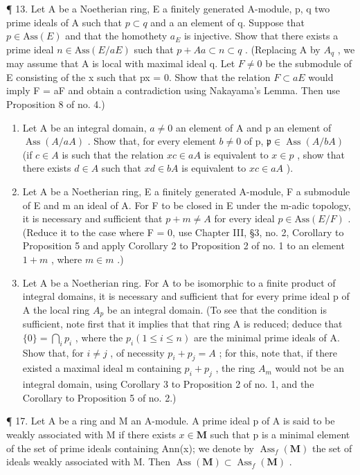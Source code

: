 ¶ 13. Let A be a Noetherian ring, E a finitely generated A-module, p, q two prime ideals of A such that \(p \subset q\) and a an element of q. Suppose that \(p \in \text{Ass}(E)\) and that the homothety \(a_{E}\) is injective. Show that there exists a prime ideal \(n \in \text{Ass}(E/aE)\) such that \(p + Aa \subset n \subset q\) . (Replacing A by \(A_{q}\) , we may assume that A is local with maximal ideal q. Let \(F \neq 0\) be the submodule of E consisting of the x such that px = 0. Show that the relation \(F \subset aE\) would imply F = aF and obtain a contradiction using Nakayama's Lemma. Then use Proposition 8 of no. 4.)

\begin{enumerate}
\def\labelenumi{\arabic{enumi}.}
\setcounter{enumi}{13}
\item
  Let A be an integral domain, \(a \neq 0\) an element of A and p an element of \(\operatorname{Ass}(A/aA)\) . Show that, for every element \(b \neq 0\) of p, \(\mathfrak{p} \in \operatorname{Ass}(A/bA)\) (if \(c \in A\) is such that the relation \(xc \in aA\) is equivalent to \(x \in p\) , show that there exists \(d \in A\) such that \(xd \in bA\) is equivalent to \(xc \in aA\) ).
\item
  Let A be a Noetherian ring, E a finitely generated A-module, F a submodule of E and m an ideal of A. For F to be closed in E under the m-adic topology, it is necessary and sufficient that \(p + m \neq A\) for every ideal \(p \in \text{Ass}(E/F)\) . (Reduce it to the case where F = 0, use Chapter III, §3, no. 2, Corollary to Proposition 5 and apply Corollary 2 to Proposition 2 of no. 1 to an element \(1 + m\) , where \(m \in m\) .)
\item
  Let A be a Noetherian ring. For A to be isomorphic to a finite product of integral domains, it is necessary and sufficient that for every prime ideal p of A the local ring \(A_{p}\) be an integral domain. (To see that the condition is sufficient, note first that it implies that that ring A is reduced; deduce that \(\{0\} = \bigcap_{i} p_{i}\) , where the \(p_{i} (1 \leqslant i \leqslant n)\) are the minimal prime ideals of A. Show that, for \(i \neq j\) , of necessity \(p_{i} + p_{j} = A\) ; for this, note that, if there existed a maximal ideal m containing \(p_{i} + p_{j}\) , the ring \(A_{m}\) would not be an integral domain, using Corollary 3 to Proposition 2 of no. 1, and the Corollary to Proposition 5 of no. 2.)
\end{enumerate}

¶ 17. Let A be a ring and M an A-module. A prime ideal p of A is said to be weakly associated with M if there exists \(x \in \mathbf{M}\) such that p is a minimal element of the set of prime ideals containing Ann(x); we denote by \(\operatorname{Ass}_{f}(\mathbf{M})\) the set of ideals weakly associated with M. Then \(\operatorname{Ass}(\mathbf{M}) \subset \operatorname{Ass}_{f}(\mathbf{M})\) .

